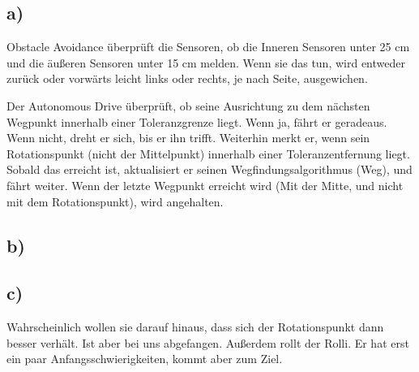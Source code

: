 \documentclass{../Vorlage/mat}
\begin{document}
\subsection*{a)}
Obstacle Avoidance überprüft die Sensoren, ob die Inneren Sensoren unter 25 cm und die äußeren Sensoren unter 15 cm melden. Wenn sie das tun, wird entweder zurück oder vorwärts leicht links oder rechts, je nach Seite, ausgewichen.

Der Autonomous Drive überprüft, ob seine Ausrichtung zu dem nächsten Wegpunkt innerhalb einer Toleranzgrenze liegt. Wenn ja, fährt er geradeaus. Wenn nicht, dreht er sich, bis er ihn trifft. Weiterhin merkt er, wenn sein Rotationspunkt (nicht der Mittelpunkt) innerhalb einer Toleranzentfernung liegt. Sobald das erreicht ist, aktualisiert er seinen  Wegfindungsalgorithmus (Weg), und fährt weiter. Wenn der letzte Wegpunkt erreicht wird (Mit der Mitte, und nicht mit dem Rotationspunkt), wird angehalten.
\subsection*{b)}

\subsection*{c)}
Wahrscheinlich wollen sie darauf hinaus, dass sich der Rotationspunkt dann besser verhält. Ist aber bei uns abgefangen. Außerdem rollt der Rolli. Er hat erst ein paar Anfangsschwierigkeiten, kommt aber zum Ziel.
\end{document}
